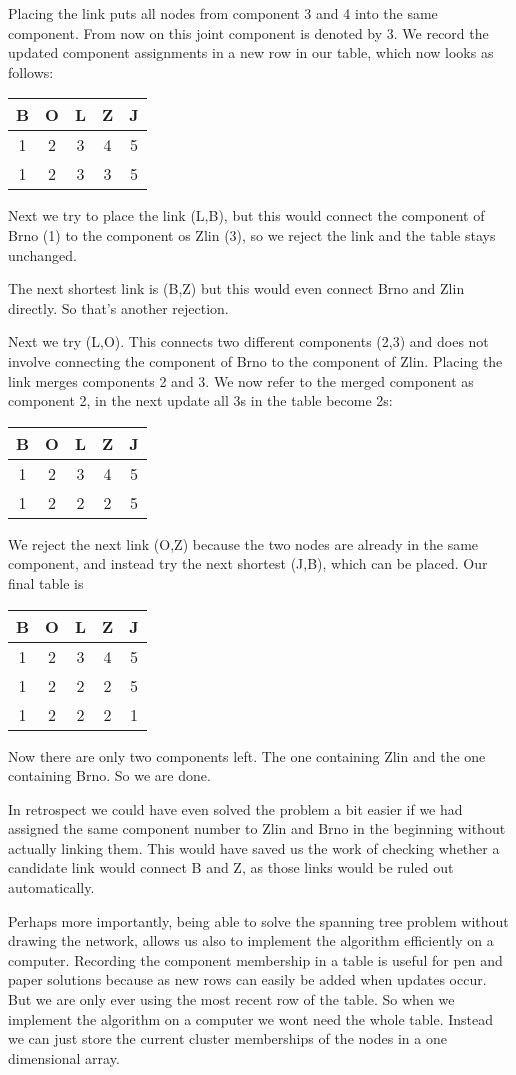 Placing the link puts all nodes from component 3 and 4 into the same component. From now on this joint component is denoted by 3. We record the updated component assignments in a new row in our table, which now looks as follows: 
\begin{center}
\begin{tabular}{c c c c c}
B & O & L & Z & J \\\hline
1 & 2 & 3 & 4 & 5 \\
1 & 2 & 3 & 3 & 5 
\end{tabular}
\end{center}
Next we try to place the link (L,B), but this would connect the component of Brno (1) to the component os Zlin (3), so we reject the link and the table stays unchanged.

The next shortest link is (B,Z) but this would even connect Brno and Zlin directly. So that's another rejection.

Next we try (L,O). This connects two different components (2,3) and does not involve connecting the component of Brno to the component of Zlin. Placing the link merges components 2 and 3. We now refer to the merged component as component 2, in the next update all 3s in the table become 2s:
\begin{center}
\begin{tabular}{c c c c c}
B & O & L & Z & J \\\hline
1 & 2 & 3 & 4 & 5 \\
1 & 2 & 2 & 2 & 5 
\end{tabular}
\end{center}
We reject the next link (O,Z) because the two nodes are already in the same component, and instead try the next shortest (J,B), which can be placed. Our final table is 
\begin{center}
\begin{tabular}{c c c c c}
B & O & L & Z & J \\\hline
1 & 2 & 3 & 4 & 5 \\
1 & 2 & 2 & 2 & 5 \\
1 & 2 & 2 & 2 & 1 
\end{tabular}
\end{center}
Now there are only two components left. The one containing Zlin and the one containing Brno. So we are done. 

In retrospect we could have even solved the problem a bit easier if we had assigned the same component number to Zlin and Brno in the beginning without actually linking them. This would have saved us the work of checking whether a candidate link would connect B and Z, as those links would be ruled out automatically. 

Perhaps more importantly, being able to solve the spanning tree problem without drawing the network, allows us also to implement the algorithm efficiently on a computer. Recording the component membership in a table is useful for pen and paper solutions because as new rows can easily be added when updates occur. But we are only ever using the most recent row of the table. So when we implement the algorithm on a computer we wont need the whole table. Instead we can just store the current cluster memberships of the nodes in a one dimensional array.  



